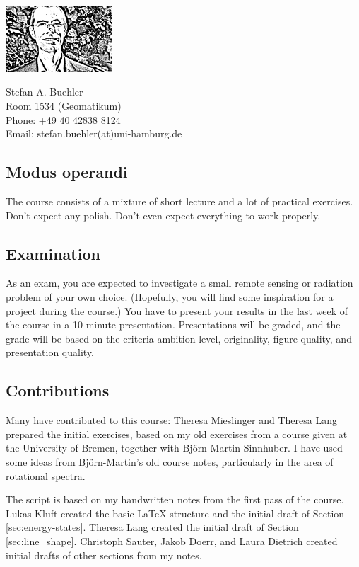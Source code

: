 \includegraphics[width=4cm]{figures/buehler_portrait_sketch}
~
\begin{minipage}{0.5\linewidth}
  \vspace*{-1.6cm}
  Stefan A. Buehler\\
  Room 1534 (Geomatikum)\\
  Phone: +49 40 42838 8124\\
  Email: stefan.buehler(at)uni-hamburg.de\\
\end{minipage}

\subsection*{Modus operandi}

The course consists of a mixture of short lecture and a lot of
practical exercises. Don’t expect any polish. Don’t even expect
everything to work properly.

\subsection*{Examination}

As an exam, you are expected to investigate a small remote sensing or
radiation problem of your own choice. (Hopefully, you will find some
inspiration for a project during the course.) You have to present your
results in the last week of the course in a 10 minute
presentation. Presentations will be graded, and the grade will be
based on the criteria ambition level, originality, figure quality, and
presentation quality.

\subsection*{Contributions}

Many have contributed to this course: Theresa Mieslinger and Theresa
Lang prepared the initial exercises, based on my old exercises from a
course given at the University of Bremen, together with Björn-Martin
Sinnhuber. I have used some ideas from Björn-Martin's old course
notes, particularly in the area of rotational spectra.

The script is based on my handwritten notes from the first pass of the
course.  Lukas Kluft created the basic LaTeX structure and the initial
draft of Section \ref{sec:energy-states}. Theresa Lang created the
initial draft of Section \ref{sec:line_shape}. Christoph Sauter, Jakob
Doerr, and Laura Dietrich created initial drafts of other sections
from my notes.

